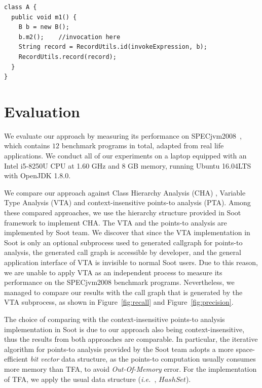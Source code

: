 \documentclass{fac}
\newcommand\ie{\textit{i.e.\ }}
\begin{document}
\begin{minipage}{\linewidth}
\vspace{10pt}
\begin{lstlisting}[caption={Example code after instrumentation},label={lst:after-instru}]
class A {
  public void m1() {
    B b = new B();
    b.m2();    //invocation here
    String record = RecordUtils.id(invokeExpression, b);
    RecordUtils.record(record);
  }
}
\end{lstlisting}
\end{minipage}

\section{Evaluation}\label{sec:evaluation}
We evaluate our approach by measuring its performance on SPECjvm2008~\cite{specjvm}, which contains $12$ benchmark programs in total, adapted from real life applications. We conduct all of our experiments on a laptop equipped with an Intel i5-8250U CPU at 1.60 GHz and 8 GB memory, running Ubuntu 16.04LTS with OpenJDK 1.8.0.

We compare our approach against Class Hierarchy Analysis (CHA) , Variable Type Analysis (VTA) and context-insensitive points-to analysis (PTA). Among these compared approaches, we use the hierarchy structure provided in Soot framework to implement CHA. The VTA and the points-to analysis are implemented by Soot team. We discover that since the VTA implementation in Soot is only an optional subprocess used to generated callgraph for points-to analysis, the generated call graph is accessible by developer, and the general application interface of VTA is invisible to normal Soot users. Due to this reason, we are unable to apply VTA as an independent process to measure its performance on the SPECjvm2008 benchmark programs.
Nevertheless, we managed to compare our results with the call graph that is generated by the VTA subprocess, as shown in Figure~\ref{fig:recall} and Figure~\ref{fig:precision}.

The choice of comparing with the context-insensitive points-to analysis implementation in Soot is due to our approach also being context-insensitive, thus the results from both approaches are comparable. In particular, the iterative algorithm for points-to analysis %
provided by the Soot team adopts a more space-efficient \emph{bit vector} data structure, as the points-to computation usually consumes more memory than TFA, to avoid \emph{Out-Of-Memory} error. For the implementation of TFA, we apply the usual data structure (\ie, $HashSet$).
%
\end{document}
